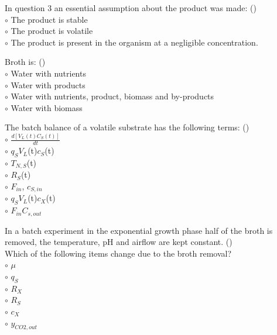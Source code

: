 \documentclass[]{beamer}
\begin{document}
\begin{frame}[shrink] {}
\addtocounter{questions}{1}
\color{blue}
In question 3 an essential assumption about the product was made: ()\\
\color{black}
\setlength{\parindent}{-0.4cm}
{\color{red}$\circ$}  The product is stable \\
{\color{red}$\circ$} The product is volatile \\
{\color{red}$\circ$} The product is present in the organism at a negligible concentration.  \\
\end{frame}

\begin{frame}[shrink] {}
\addtocounter{questions}{1}
\color{blue}
Broth is: ()\\
\color{black}
\setlength{\parindent}{-0.4cm}
{\color{red}$\circ$}  Water with nutrients \\
{\color{red}$\circ$} Water with products \\
{\color{red}$\circ$}  Water with nutrients, product, biomass and by-products \\
{\color{red}$\circ$} Water with biomass  \\
\end{frame}

\begin{frame}[shrink] {} 
\color{blue}
    
The batch balance of a volatile substrate has the following terms: ({\color{red}{Q6}})\\[0.5em]
\color{black}
\setlength{\parindent}{-0.4cm}
{\color{red}$\circ$} $\frac{d[V_L(t)C_S(t)]}{dt}$  \\
{\color{red}$\circ$} $q_{S}$$V_{L}$(t)$c_{S}$(t)  \\
{\color{red}$\circ$} $T_{N,S}$(t)  \\
{\color{red}$\circ$} $R_{S}$(t)  \\
{\color{red}$\circ$} $F_{in}$, $c_{S,in}$  \\
{\color{red}$\circ$} $q_{S}$$V_{L}$(t)$c_{X}$(t)  \\
{\color{red}$\circ$} $F_{in}$$C_{s,out}$  \\
\end{frame}


\begin{frame}[shrink] {} 
\color{blue}
  In a batch experiment in the exponential growth phase half of the broth is removed, the temperature, pH and airflow are kept constant.
 ({\color{red}{Q7}})\\
  Which of the following items change due to the broth removal?
  \\
\color{black}
\setlength{\parindent}{-0.4cm}
{\color{red}$\circ$} $\mu$  \\
{\color{red}$\circ$} $q_{S}$  \\
{\color{red}$\circ$} $R_{X}$  \\
{\color{red}$\circ$} $R_{S}$  \\
{\color{red}$\circ$} $c_{X}$  \\
{\color{red}$\circ$} $y_{CO2,out}$  \\
\end{frame}
\end{document}
